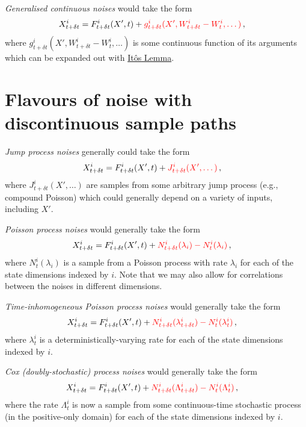 \documentclass[sts]{imsart}
\begin{document}
\emph{Generalised continuous noises} would take the form
\begin{align}
& X^i_{t+\delta t} = F^i_{t+\delta t}(X', t) + \textcolor{red}{g^i_{t+\delta t}(X', W^i_{t+\delta t}-W^i_t, \dots)}\,,
\end{align}
where $g^i_{t+\delta t}(X', W^i_{t+\delta t}-W^i_t, \dots)$ is some continuous function of its arguments which can be expanded out with \href{https://en.wikipedia.org/wiki/It\%C3\%B4\%27s_lemma}{Itôs Lemma}.


\section*{Flavours of noise with discontinuous sample paths}

\emph{Jump process noises} generally could take the form
\begin{align}
& X^i_{t+\delta t} = F^i_{t+\delta t}(X', t) + \textcolor{red}{J^i_{t+\delta t}(X', \dots )}\,,
\end{align}
where $J^i_{t+\delta t}(X', \dots )$ are samples from some arbitrary jump process (e.g., compound Poisson) which could generally depend on a variety of inputs, including $X'$. 

\emph{Poisson process noises} would generally take the form
\begin{align}
& X^i_{t+\delta t} = F^i_{t+\delta t}(X', t) + \textcolor{red}{N^i_{t+\delta t}({\lambda_i})-N^i_{t}({\lambda_i})}\,,
\end{align}
where $N^i_{t}({\lambda_i})$ is a sample from a Poisson process with rate $\lambda_i$ for each of the state dimensions indexed by $i$. Note that we may also allow for correlations between the noises in different dimensions.

\emph{Time-inhomogeneous Poisson process noises} would generally take the form
\begin{align}
& X^i_{t+\delta t} = F^i_{t+\delta t}(X', t) + \textcolor{red}{N^i_{t+\delta t}({\lambda^i_{t+\delta t}})-N^i_{t}({\lambda^i_t})}\,,
\end{align}
where $\lambda^i_{t}$ is a deterministically-varying rate for each of the state dimensions indexed by $i$.

\emph{Cox (doubly-stochastic) process noises} would generally take the form
\begin{align}
& X^i_{t+\delta t} = F^i_{t+\delta t}(X', t) + \textcolor{red}{N^i_{t+\delta t}({\Lambda^i_{t+\delta t}})-N^i_{t}({\Lambda^i_{t}})}\,,
\end{align}
where the rate $\Lambda^i_{t}$ is now a sample from some continuous-time stochastic process (in the positive-only domain) for each of the state dimensions indexed by $i$.
\end{document}
